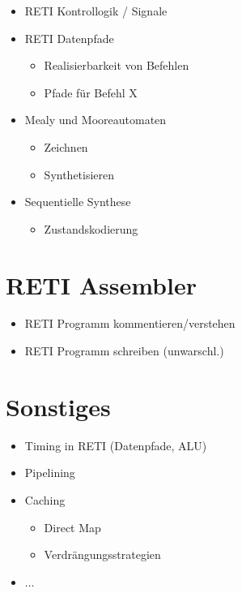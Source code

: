 \documentclass{scrartcl}[9pt, a4paper]
\begin{document}
\begin{itemize}
	\item RETI Kontrollogik / Signale
	\item RETI Datenpfade
	      \begin{itemize}
	      	\item Realisierbarkeit von Befehlen
	      	\item Pfade für Befehl X
	      \end{itemize}
	\item Mealy und Mooreautomaten
	      \begin{itemize}
	      	\item Zeichnen
	      	\item Synthetisieren
	      \end{itemize}
	\item Sequentielle Synthese
	      \begin{itemize}
	      	\item Zustandskodierung
	      \end{itemize}
\end{itemize}

\section*{RETI Assembler}

\begin{itemize}
	\item RETI Programm kommentieren/verstehen
	\item RETI Programm schreiben (unwarschl.)
\end{itemize}

\section*{Sonstiges}

\begin{itemize}
	\item Timing in RETI (Datenpfade, ALU)
	\item Pipelining
	\item Caching
	      \begin{itemize}
	      	\item Direct Map
	      	\item Verdrängungsstrategien
	      \end{itemize}
	\item ...
\end{itemize}
\end{document}
